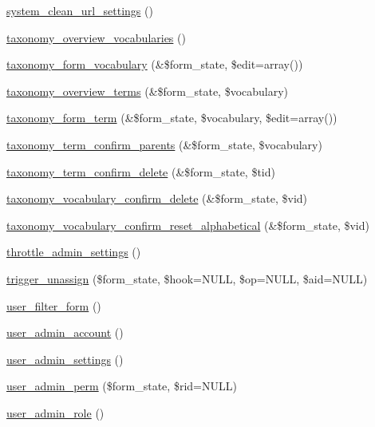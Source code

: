 \begin{CompactItemize}
\item 
\hyperlink{group__forms_g39fa3ba9127e8c9a25343c06cd9a3f1c}{system\_\-clean\_\-url\_\-settings} ()
\item 
\hyperlink{group__forms_g1540d991eabc53c2c1af6629455035ff}{taxonomy\_\-overview\_\-vocabularies} ()
\item 
\hyperlink{group__forms_gba5c105f6b3e1a7e85f65fdaa067e0eb}{taxonomy\_\-form\_\-vocabulary} (\&\$form\_\-state, \$edit=array())
\item 
\hyperlink{group__forms_g27f78faeeac394ba8359e22501c5b333}{taxonomy\_\-overview\_\-terms} (\&\$form\_\-state, \$vocabulary)
\item 
\hyperlink{group__forms_gc57918eae4868ce5e1c8d62c995ae295}{taxonomy\_\-form\_\-term} (\&\$form\_\-state, \$vocabulary, \$edit=array())
\item 
\hyperlink{group__forms_gc82e5e08d7d2fb7ce069411512dbc524}{taxonomy\_\-term\_\-confirm\_\-parents} (\&\$form\_\-state, \$vocabulary)
\item 
\hyperlink{group__forms_g409c50f3f4727ec2856079e7abb01eba}{taxonomy\_\-term\_\-confirm\_\-delete} (\&\$form\_\-state, \$tid)
\item 
\hyperlink{group__forms_gc5c29e41ed1c0a05b4678e69aff1d947}{taxonomy\_\-vocabulary\_\-confirm\_\-delete} (\&\$form\_\-state, \$vid)
\item 
\hyperlink{group__forms_g439f9d499952ff3647ffe0c660d0bd65}{taxonomy\_\-vocabulary\_\-confirm\_\-reset\_\-alphabetical} (\&\$form\_\-state, \$vid)
\item 
\hyperlink{group__forms_g0eb8c200e818d57f21108249cd048621}{throttle\_\-admin\_\-settings} ()
\item 
\hyperlink{group__forms_gc2c2d1e7054da26671a18e1a6d1e4631}{trigger\_\-unassign} (\$form\_\-state, \$hook=NULL, \$op=NULL, \$aid=NULL)
\item 
\hyperlink{group__forms_g4492f8566743ff967248ff7d22108a54}{user\_\-filter\_\-form} ()
\item 
\hyperlink{group__forms_g3dde5a35fbda589c3fb9a4bb6d4b1d9a}{user\_\-admin\_\-account} ()
\item 
\hyperlink{group__forms_g8cb1bc70278e0e628fd17c2ec8353bd1}{user\_\-admin\_\-settings} ()
\item 
\hyperlink{group__forms_g6e5c6e76662734247a6c7ee90af67b26}{user\_\-admin\_\-perm} (\$form\_\-state, \$rid=NULL)
\item 
\hyperlink{group__forms_g90d892becb335c456346eecbbc3bb6de}{user\_\-admin\_\-role} ()
\item 

\end{CompactItemize}
